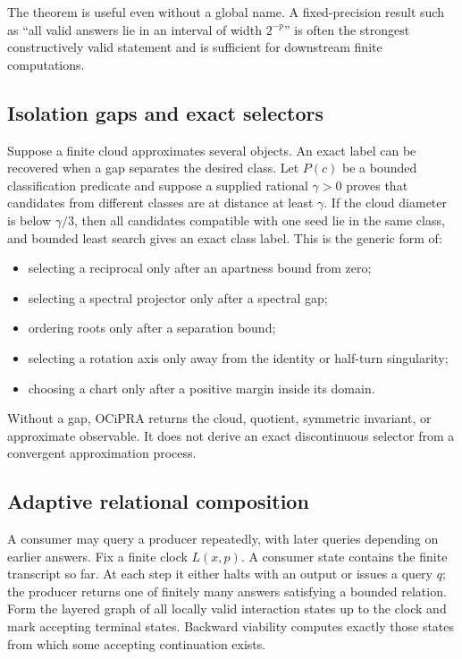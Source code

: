 The theorem is useful even without a global name.  A fixed-precision result such as ``all valid answers lie in an interval of width $2^{-p}$'' is often the strongest constructively valid statement and is sufficient for downstream finite computations.

\subsection{Isolation gaps and exact selectors}

Suppose a finite cloud approximates several objects.  An exact label can be recovered when a gap separates the desired class.  Let $P(c)$ be a bounded classification predicate and suppose a supplied rational $\gamma>0$ proves that candidates from different classes are at distance at least $\gamma$.  If the cloud diameter is below $\gamma/3$, then all candidates compatible with one seed lie in the same class, and bounded least search gives an exact class label.  This is the generic form of:

\begin{itemize}
  \item selecting a reciprocal only after an apartness bound from zero;
  \item selecting a spectral projector only after a spectral gap;
  \item ordering roots only after a separation bound;
  \item selecting a rotation axis only away from the identity or half-turn singularity;
  \item choosing a chart only after a positive margin inside its domain.
\end{itemize}

Without a gap, OCiPRA returns the cloud, quotient, symmetric invariant, or approximate observable.  It does not derive an exact discontinuous selector from a convergent approximation process.

\subsection{Adaptive relational composition}

A consumer may query a producer repeatedly, with later queries depending on earlier answers.  Fix a finite clock $L(x,p)$.  A consumer state contains the finite transcript so far.  At each step it either halts with an output or issues a query $q$; the producer returns one of finitely many answers satisfying a bounded relation.  Form the layered graph of all locally valid interaction states up to the clock and mark accepting terminal states.  Backward viability computes exactly those states from which some accepting continuation exists.

